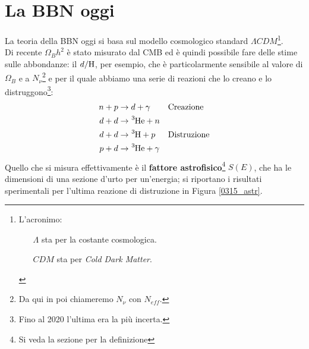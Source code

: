 \section{La BBN oggi}
La teoria della BBN oggi si basa sul modello cosmologico standard $\Lambda CDM$\footnote{L'acronimo:%
\begin{itemize}
    \item[$\Lambda$] sta per la costante cosmologica.
    \item[$CDM$] sta per \textit{Cold Dark Matter}.
\end{itemize}
}.\\
Di recente $\Omega_B h^2$ è stato misurato dal CMB ed è quindi possibile fare delle stime sulle abbondanze: il $d/\ce{H}$, per esempio, che è particolarmente sensibile al valore di $\Omega_B$ e a $N_\nu$\footnote{Da qui in poi chiameremo $N_\nu$ con $N_{eff}$.} e per il quale abbiamo una serie di reazioni che lo creano e lo distruggono\footnote{Fino al 2020 l'ultima era la più incerta.}:
\begin{displaymath}
\begin{aligned}
n + p &\to d + \gamma & &\text{Creazione} \\
d + d &\to \ce{^3He} + n & \\
d + d &\to \ce{^3H}  + p &  &\text{Distruzione} \\
p + d &\to \ce{^3He} + \gamma & 
\end{aligned}
\end{displaymath}
Quello che si misura effettivamente è il \textbf{fattore astrofisico}\footnote{Si veda la sezione  per la definizione} $S(E)$, che ha le dimensioni di una sezione d'urto per un'energia; si riportano i risultati sperimentali per l'ultima reazione di distruzione in Figura \ref{0315_astr}.

